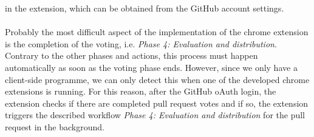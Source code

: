 \documentclass[sigconf]{acmart}
\begin{document}
in the extension, which can be obtained from the GitHub account settings. \\ \\
Probably the most difficult aspect of the implementation of the chrome extension is the completion of the voting, i.e. \textit{Phase 4: 
Evaluation and distribution}. Contrary to the other phases and actions, this process must happen automatically as soon as the 
voting phase ends. However, since we only have a client-side programme, we can only detect this when one of the developed 
chrome extensions is running. For this reason, after the GitHub oAuth login, the extension checks if there are completed pull 
request votes and if so, the extension triggers the described workflow \textit{Phase 4: Evaluation and distribution} for the 
pull request in the background.
\end{document}
